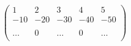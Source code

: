 \documentclass[12pt]{article}
\begin{document}
$$
\left(
\begin{array}{ccccc}
1 & 2 & 3 & 4 &5 \\
-10 & -20 & -30 & -40 & -50 \\
\\
\ldots & 0 & \ldots & 0  & \ldots \\
\end{array}
\right)
$$
\end{document}
